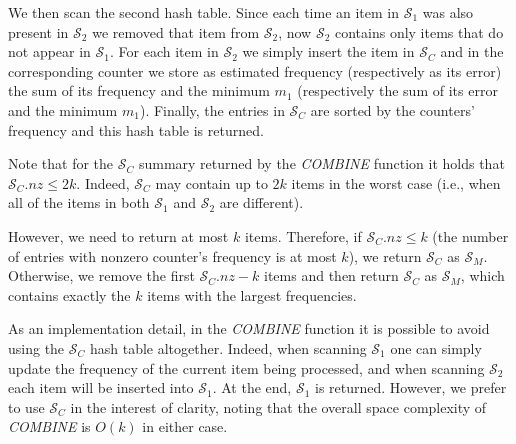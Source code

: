 \documentclass[final,3p,times]{elsarticle}
\begin{document}
We then scan the second hash table. Since each time an item in $\mathcal{S}_1$ was also present in $\mathcal{S}_2$ we removed that item from $\mathcal{S}_2$, now $\mathcal{S}_2$ contains only items that do not appear in $\mathcal{S}_1$. For each item in $\mathcal{S}_2$ we simply insert the item in $\mathcal{S}_C$ and in the corresponding counter we store as estimated frequency (respectively as its error) the sum of its frequency and the minimum $m_1$ (respectively the sum of its error and the minimum $m_1$). Finally, the entries in $\mathcal{S}_C$ are sorted by the counters' frequency and this hash table is returned.

Note that for the $\mathcal{S}_C$ summary returned by the \textit{COMBINE} function it holds that $\mathcal{S}_C.nz \leq 2k$. Indeed, $\mathcal{S}_C$  may contain up to $2k$ items in the worst case (i.e., when all of the items in both $\mathcal{S}_1$ and $\mathcal{S}_2$ are different). 

However, we need to return at most $k$ items. Therefore, if $\mathcal{S}_C.nz \leq k$ (the number of entries with nonzero counter's frequency is at most $k$), we return $\mathcal{S}_C$ as $\mathcal{S}_M$. Otherwise, we remove the first $\mathcal{S}_C.nz - k$ items and then return $\mathcal{S}_C$ as $\mathcal{S}_M$, which contains exactly the $k$ items with the largest frequencies.

As an implementation detail, in the \textit{COMBINE} function it is possible to avoid using the $\mathcal{S}_C$ hash table altogether. Indeed, when scanning $\mathcal{S}_1$ one can simply update the frequency of the current item being processed, and when scanning $\mathcal{S}_2$ each item will be inserted into $\mathcal{S}_1$. At the end, $\mathcal{S}_1$ is returned. However, we prefer to use $\mathcal{S}_C$ in the interest of clarity, noting that the overall space complexity of \textit{COMBINE} is $O(k)$ in either case.
\end{document}

